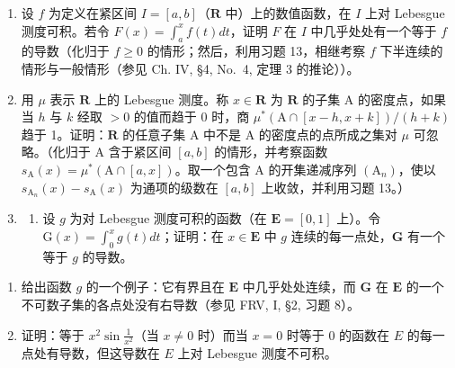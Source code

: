 \begin{enumerate}
\def\labelenumi{\arabic{enumi})}
\setcounter{enumi}{13}
\item
  设 \(f\) 为定义在紧区间 \(I = [a, b]\)（\(\mathbf{R}\) 中）上的数值函数，在 \(I\) 上对 Lebesgue 测度可积。若令 \(F(x) = \int_{a}^{x} f(t) dt\)，证明 \(F\) 在 \(I\) 中几乎处处有一个等于 \(f\) 的导数（化归于 \(f \geqslant 0\) 的情形；然后，利用习题 13，相继考察 \(f\) 下半连续的情形与一般情形（参见 Ch. IV, §4, No.~4, 定理 3 的推论））。
\item
  用 \(\mu\) 表示 \(\mathbf{R}\) 上的 Lebesgue 测度。称 \(x \in \mathbf{R}\) 为 \(\mathbf{R}\) 的子集 A 的密度点，如果当 \(h\) 与 \(k\) 经取 \(>0\) 的值而趋于 0 时，商 \(\mu^{*}(\mathrm{A} \cap [x - h, x + k]) / (h + k)\) 趋于 1。证明：\(\mathbf{R}\) 的任意子集 A 中不是 A 的密度点的点所成之集对 \(\mu\) 可忽略。（化归于 A 含于紧区间 \([a, b]\) 的情形，并考察函数 \(s_{\mathrm{A}}(x) = \mu^{*}(\mathrm{A} \cap [a, x])\)。取一个包含 A 的开集递减序列 \((\mathrm{A}_n)\)，使以 \(s_{\mathrm{A}_n}(x) - s_{\mathrm{A}}(x)\) 为通项的级数在 \([a, b]\) 上收敛，并利用习题 13。）
\item
  \begin{enumerate}
  \def\labelenumii{\alph{enumii})}
  \tightlist
  \item
    设 \(g\) 为对 Lebesgue 测度可积的函数（在 \(\mathbf{E} = [0,1]\) 上）。令 \(\mathrm{G}(x) = \int_0^x g(t)dt\)；证明：在 \(x \in \mathbf{E}\) 中 \(g\) 连续的每一点处，\(\mathbf{G}\) 有一个等于 \(g\) 的导数。
  \end{enumerate}
\end{enumerate}

\begin{enumerate}
\def\labelenumi{\alph{enumi})}
\setcounter{enumi}{1}
\item
  给出函数 \(g\) 的一个例子：它有界且在 \(\mathbf{E}\) 中几乎处处连续，而 \(\mathbf{G}\) 在 \(\mathbf{E}\) 的一个不可数子集的各点处没有右导数（参见 FRV, I, §2, 习题 8）。
\item
  证明：等于 \(x^2 \sin \frac{1}{x^2}\)（当 \(x \neq 0\) 时）而当 \(x = 0\) 时等于 0 的函数在 \(E\) 的每一点处有导数，但这导数在 \(E\) 上对 Lebesgue 测度不可积。
\end{enumerate}

